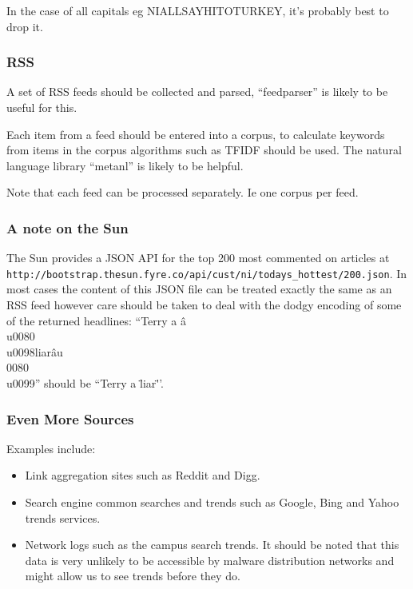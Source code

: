 In the case of all capitals eg NIALLSAYHITOTURKEY, it's probably best to drop it.

\subsubsection{RSS}
A set of RSS feeds should be collected and parsed, ``feedparser'' is likely to be useful for this.

Each item from a feed should be entered into a corpus, to calculate keywords from items in the corpus algorithms such as TFIDF should be used. The natural language library ``metanl'' is likely to be helpful.

Note that each feed can be processed separately. Ie one corpus per feed.

\subsubsection{A note on the Sun}
The Sun provides a JSON API for the top 200 most commented on articles at \verb`http://bootstrap.thesun.fyre.co/api/cust/ni/todays_hottest/200.json`. In most cases the content of this JSON file can be treated exactly the same as an RSS feed however care should be taken to deal with the dodgy encoding of some of the returned headlines: ``Terry a â\\u0080\\u0098liarâu\\0080\\u0099'' should be ``Terry a \"liar\"''.

\subsubsection{Even More Sources}
Examples include:
\begin{itemize}
    \item Link aggregation sites such as Reddit and Digg.
    \item Search engine common searches and trends such as Google, Bing and Yahoo trends services.
    \item Network logs such as the campus search trends. It should be noted that this data is very unlikely to be accessible by malware distribution networks and might allow us to see trends before they do.
\end{itemize}


